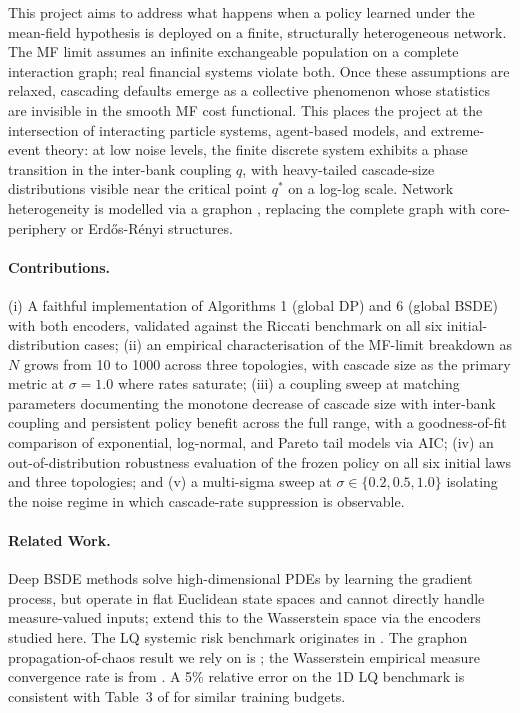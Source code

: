 \documentclass[11pt]{article}
\begin{document}
This project aims to address what happens when a policy learned under the mean-field hypothesis is deployed on a finite, structurally heterogeneous network. The MF limit assumes an infinite exchangeable population on a complete interaction graph; real financial systems violate both. Once these assumptions are relaxed, cascading defaults emerge as a collective phenomenon whose statistics are invisible in the smooth MF cost functional. This places the project at the intersection of interacting particle systems, agent-based models, and extreme-event theory: at low noise levels, the finite discrete system exhibits a phase transition in the inter-bank coupling $q$, with heavy-tailed cascade-size distributions visible near the critical point $q^*$ on a log-log scale. Network heterogeneity is modelled via a graphon \citep{lovasz2012large}, replacing the complete graph with core-periphery or Erdős-Rényi structures.

\paragraph{Contributions.}
(i) A faithful implementation of Algorithms 1 (global DP) and 6 (global BSDE) with both encoders, validated against the Riccati benchmark on all six initial-distribution cases; (ii) an empirical characterisation of the MF-limit breakdown as $N$ grows from 10 to 1000 across three topologies, with cascade size as the primary metric at $\sigma=1.0$ where rates saturate; (iii) a coupling sweep at matching parameters documenting the monotone decrease of cascade size with inter-bank coupling and persistent policy benefit across the full range, with a goodness-of-fit comparison of exponential, log-normal, and Pareto tail models via AIC; (iv) an out-of-distribution robustness evaluation of the frozen policy on all six initial laws and three topologies; and (v) a multi-sigma sweep at $\sigma \in \{0.2, 0.5, 1.0\}$ isolating the noise regime in which cascade-rate suppression is observable.

\paragraph{Related Work.}
Deep BSDE methods \citep{han2018deep} solve high-dimensional PDEs by learning the gradient process, but operate in flat Euclidean state spaces and cannot directly handle measure-valued inputs; \citet{pham2024mfnn} extend this to the Wasserstein space via the encoders studied here. The LQ systemic risk benchmark originates in \citet{carmona2015systemic}. The graphon propagation-of-chaos result we rely on is \citet{coppini2025graphon}; the Wasserstein empirical measure convergence rate is from \citet{fournier2015rate}. A 5\% relative error on the 1D LQ benchmark is consistent with Table~3 of \citet{pham2024mfnn} for similar training budgets.
\end{document}
